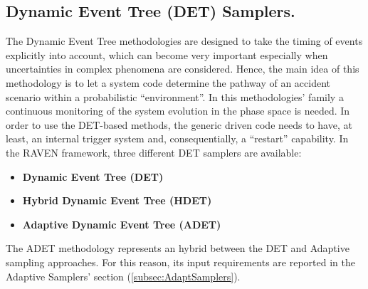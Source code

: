 \subsection{Dynamic Event Tree (DET) Samplers.}
\label{subsec:DETSamplers}
The Dynamic Event Tree methodologies are designed to take the timing of events explicitly into account, which can become very important especially when uncertainties in complex phenomena are considered. Hence, the main idea of this methodology is to let a system code determine the pathway of an accident scenario within a probabilistic ``environment''. 
In this methodologies' family a continuous monitoring of the system evolution in the phase space is needed.  In order to use the DET-based methods, the generic driven  code needs to have, at least, an internal trigger system and, consequentially, a ``restart'' capability.
In the RAVEN framework, three different  DET samplers are available: 
\begin{itemize}
\item \textbf{Dynamic Event Tree (DET)}
\item \textbf{Hybrid Dynamic Event Tree (HDET)}
\item \textbf{Adaptive Dynamic Event Tree (ADET)}
\end{itemize}
The ADET methodology represents an hybrid between the DET and Adaptive sampling approaches. For this reason, its input requirements are reported in the Adaptive Samplers' section (\ref{subsec:AdaptSamplers}).


